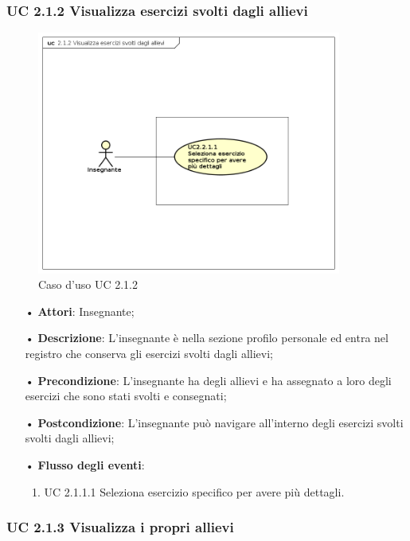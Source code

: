 \subsubsection{UC 2.1.2  Visualizza esercizi svolti dagli allievi}
\begin{figure}[H]
\centering
\includegraphics[width=10cm]{img/UC212.png} 
\caption{Caso d'uso UC 2.1.2}
\end{figure}
\begin{itemize}
	\item[•] \textbf{Attori}: Insegnante;
	\item[•] \textbf{Descrizione}:  L’insegnante è nella sezione profilo personale ed entra
		nel registro che conserva gli esercizi svolti dagli allievi;
	\item[•] \textbf{Precondizione}:  L’insegnante ha degli allievi e ha assegnato a loro degli esercizi che sono stati svolti e consegnati;

	\item[•] \textbf{Postcondizione}: L’insegnante può navigare all’interno degli esercizi svolti 
                       svolti dagli allievi; 

	\item[•] \textbf{Flusso degli eventi}:
		\begin{enumerate}
			\item UC 2.1.1.1  Seleziona esercizio specifico per avere più dettagli.	
		\end{enumerate}
\end{itemize}

\subsubsection{UC 2.1.3 Visualizza i propri allievi}

